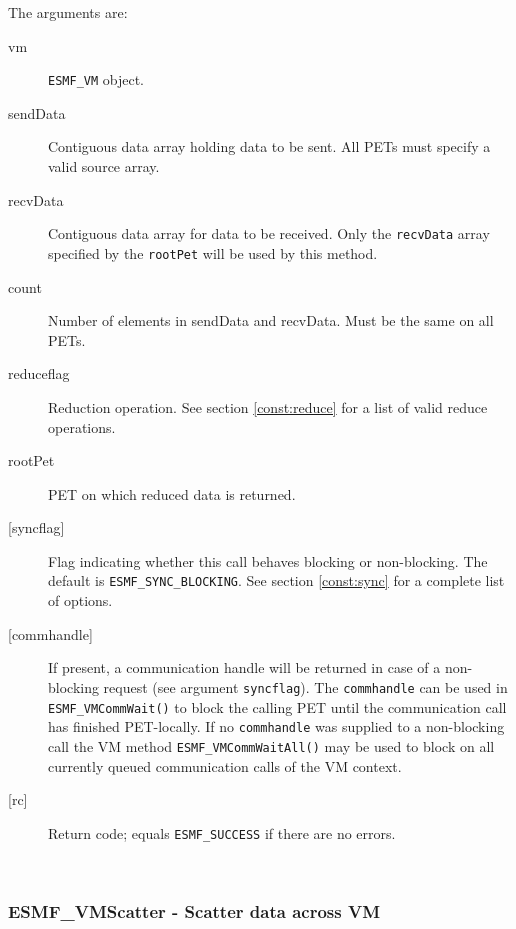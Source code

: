      The arguments are:
     \begin{description}
     \item[vm] 
          {\tt ESMF\_VM} object.
     \item[sendData]
          Contiguous data array holding data to be sent. All PETs must specify a
          valid source array.
     \item[recvData] 
          Contiguous data array for data to be received. Only the {\tt recvData}
          array specified by the {\tt rootPet} will be used by this method.
     \item[count] 
          Number of elements in sendData and recvData. Must be the same on all
          PETs.
     \item[reduceflag] 
          Reduction operation. See section \ref{const:reduce} for a list of 
          valid reduce operations.
     \item[rootPet] 
          PET on which reduced data is returned.
     \item[{[syncflag]}]
          Flag indicating whether this call behaves blocking or non-blocking.
          The default is {\tt ESMF\_SYNC\_BLOCKING}. See section
          \ref{const:sync} for a complete list of options.
     \item[{[commhandle]}]
          If present, a communication handle will be returned in case of a 
          non-blocking request (see argument {\tt syncflag}). The
          {\tt commhandle} can be used in {\tt ESMF\_VMCommWait()} to block the
          calling PET until the communication call has finished PET-locally. If
          no {\tt commhandle} was supplied to a non-blocking call the VM method
          {\tt ESMF\_VMCommWaitAll()} may be used to block on all currently queued
          communication calls of the VM context.
     \item[{[rc]}] 
          Return code; equals {\tt ESMF\_SUCCESS} if there are no errors.
     \end{description}
   
 
\mbox{}\hrulefill\ 
 
\subsubsection [ESMF\_VMScatter] {ESMF\_VMScatter - Scatter data across VM}


